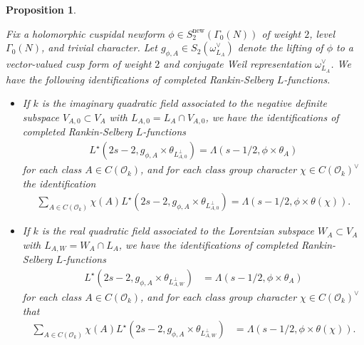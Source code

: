 \documentclass{amsart}
\newtheorem{proposition}[theorem]{Proposition}
\theoremstyle{definition}
\theoremstyle{definition}
\theoremstyle{definition}
\begin{document}
\begin{proposition}\label{RS-equiv} 

Fix a holomorphic cuspidal newform $\phi \in S^{\operatorname{new}}_2(\Gamma_0(N))$ of weight $2$, level $\Gamma_0(N)$, and trivial character. 
Let $g_{\phi, A} \in S_2(\omega_{L_A}^{\vee})$ denote the lifting of $\phi$ to a vector-valued cusp form of weight $2$ 
and conjugate Weil representation $\omega_{L_A}^{\vee}$. We have the following identifications of completed Rankin-Selberg $L$-functions. \\

\begin{itemize}

\item[(i)] If $k$ is the imaginary quadratic field associated to the negative definite subspace $V_{A, 0} \subset V_A$
with $L_{A,0} = L_A \cap V_{A,0}$, we have the identifications of completed Rankin-Selberg $L$-functions 
\begin{align*} L^{\star}(2s-2, g_{\phi, A} \times \theta_{L_{A, 0}^{\perp}}) 
= \Lambda(s-1/2, \phi \times \theta_A) \end{align*} 
for each class $A \in C(\mathcal{O}_k)$, and for each class group character $\chi \in C(\mathcal{O}_k)^{\vee}$ the identification 
\begin{align*} \sum\limits_{A \in C(\mathcal{O}_k)} \chi(A) L^{\star}(2s-2, g_{\phi, A} \times \theta_{L_{A, 0}^{\perp}}) 
= \Lambda(s-1/2, \phi \times \theta(\chi)). \end{align*} 

\item[(ii)] If $k$ is the real quadratic field associated to the Lorentzian subspace 
$W_A \subset V_A$ with $L_{A,W} = W_A \cap L_A$, we have the identifications of completed Rankin-Selberg $L$-functions 
\begin{align*} L^{\star}(2s-2, g_{\phi, A} \times \theta_{L_{A, W}^{\perp}}) &= \Lambda(s-1/2, \phi \times \theta_A)\end{align*} 
for each class $A \in C(\mathcal{O}_k)$, and for each class group character $\chi \in C(\mathcal{O}_k)^{\vee}$ that 
\begin{align*} \sum\limits_{A \in C(\mathcal{O}_k)} \chi(A) L^{\star}(2s-2, g_{\phi, A} \times \theta_{L_{A, W}^{\perp}}) 
&= \Lambda(s-1/2, \phi \times \theta(\chi)).\end{align*}

\end{itemize}

\end{proposition}
\end{document}
